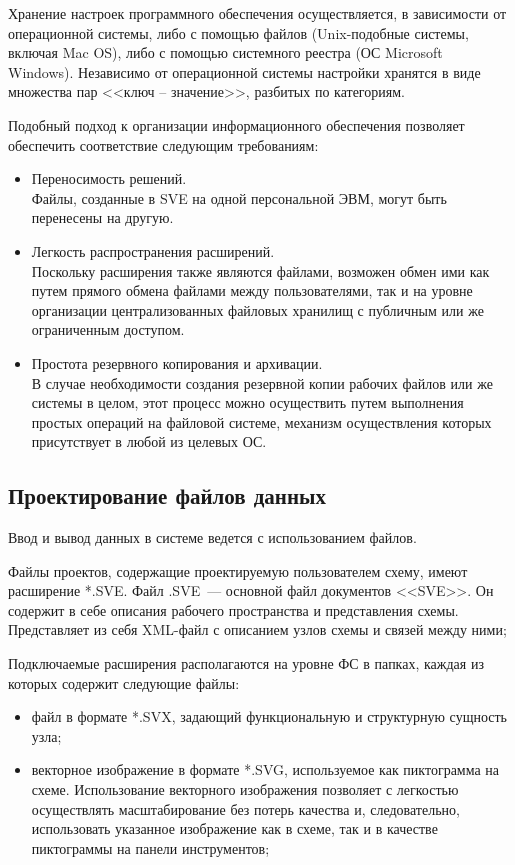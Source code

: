 Хранение настроек программного обеспечения осуществляется, в зависимости от операционной системы, либо с помощью файлов (Unix-подобные системы, включая Mac OS), либо с помощью системного реестра (ОС Microsoft Windows).
Независимо от операционной системы настройки хранятся в виде множества пар <<ключ -- значение>>, разбитых по категориям.

Подобный подход к организации информационного обеспечения позволяет обеспечить соответствие следующим требованиям:
\begin{itemize}
  \item Переносимость решений.\\
  Файлы, созданные в SVE на одной персональной ЭВМ, могут быть перенесены на другую.
  \item Легкость распространения расширений.\\
  Поскольку расширения также являются файлами, возможен обмен ими как путем прямого обмена файлами между пользователями, так и на уровне организации централизованных файловых хранилищ с публичным или же ограниченным доступом.
  \item Простота резервного копирования и архивации.\\
  В случае необходимости создания резервной копии рабочих файлов или же системы в целом, этот процесс можно осуществить путем выполнения простых операций на файловой системе, механизм осуществления которых присутствует в любой из целевых ОС.
\end{itemize}


\subsection{Проектирование файлов данных}

Ввод и вывод данных в системе ведется с использованием файлов.

Файлы проектов, содержащие проектируемую пользователем схему, имеют расширение *.SVE.
Файл .SVE~--- основной файл документов <<SVE>>.
Он содержит в себе описания рабочего пространства и представления схемы.
Представляет из себя XML-файл с описанием узлов схемы и связей между ними;

Подключаемые расширения располагаются на уровне ФС в папках, каждая из которых содержит следующие файлы:
\begin{itemize}
  \item файл в формате *.SVX, задающий функциональную и структурную сущность узла;
  \item векторное изображение в формате *.SVG, используемое как пиктограмма на схеме.
  Использование векторного изображения позволяет с легкостью осуществлять масштабирование без потерь качества и, следовательно, использовать указанное изображение как в схеме, так и в качестве пиктограммы на панели инструментов;
\end{itemize}

